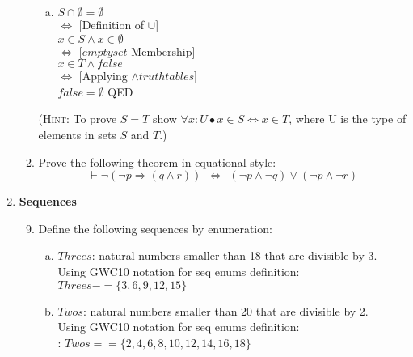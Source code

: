 \documentclass{article}
\renewcommand{\implies}{\Rightarrow}
\renewcommand{\iff}{\Leftrightarrow}
\begin{document}
\begin{enumerate}[\bf I.]
\begin{enumerate}[1.]
\begin{enumerate}[a.]
\item $S\cap\emptyset= \emptyset$ \\
  $\iff$ [Definition of $\cup$] \\
  $x \in S \land x \in \emptyset $ \\
  $\iff$ [$emptyset$ Membership]\\
  $ x \in T \land false $ \\
  $\iff$ [Applying $\land truth tables$] \\
  $false = {\emptyset}$ QED\\ 
  
  
\end{enumerate}
(\textsc{Hint}: To prove $S=T$ show $\forall x: U \bullet x \in S\Leftrightarrow x\in T$, where U is the type of elements in sets $S$ and $T$.)
\item Prove the following theorem in equational style:
$$ \vdash \neg(\neg p \implies (q\land r))~~\iff~~(\neg p\land \neg q)\lor(\neg p\land\neg r)$$

\end{enumerate}

\item \textbf{Sequences}


\begin{enumerate}[1.]\setcounter{enumii}{8}

\item Define the following sequences by enumeration:
\begin{enumerate}[a.]
\item $Threes$: natural numbers smaller than 18 that are divisible by 3. \\
  Using GWC10 notation for seq enums definition: \\
  $Threes-= \{3 , 6 ,  9 , 12 , 15\}$ \\
\item  $Twos$: natural numbers smaller than 20 that are divisible by 2. \\
  Using GWC10 notation for seq enums definition: \\:
  $Twos== \{2 , 4 , 6 , 8 , 10 , 12 , 14 , 16 , 18\}$ \\
\end{enumerate}


\end{enumerate}
\end{enumerate}
\end{document}
